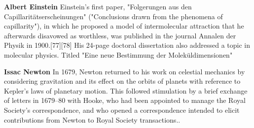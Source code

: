 \documentclass{SFEE}
\begin{document}
\begin{AuthorContribution}
    \textbf{Albert Einstein} Einstein's first paper, "Folgerungen aus den Capillaritätserscheinungen" ("Conclusions drawn from the phenomena of capillarity"), in which he proposed a model of intermolecular attraction that he afterwards disavowed as worthless, was published in the journal Annalen der Physik in 1900.[77][78] His 24-page doctoral dissertation also addressed a topic in molecular physics. Titled "Eine neue Bestimmung der Moleküldimensionen"\par
    \textbf{Issac Newton} In 1679, Newton returned to his work on celestial mechanics by considering gravitation and its effect on the orbits of planets with reference to Kepler's laws of planetary motion. This followed stimulation by a brief exchange of letters in 1679–80 with Hooke, who had been appointed to manage the Royal Society's correspondence, and who opened a correspondence intended to elicit contributions from Newton to Royal Society transactions..\par
\end{AuthorContribution}
\end{document}
